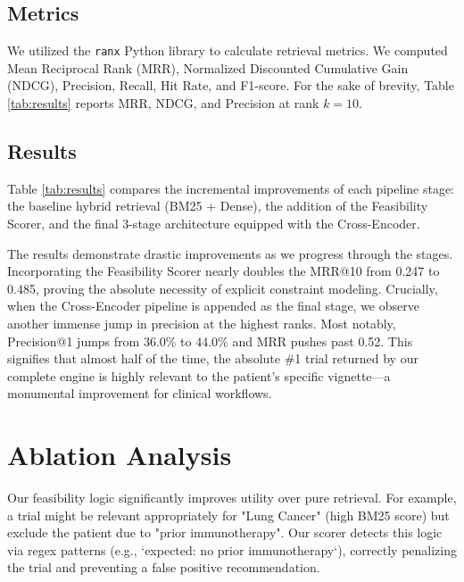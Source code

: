 \documentclass[11pt]{article}
\begin{document}
\subsection{Metrics}
We utilized the \texttt{ranx} Python library to calculate retrieval metrics. We computed Mean Reciprocal Rank (MRR), Normalized Discounted Cumulative Gain (NDCG), Precision, Recall, Hit Rate, and F1-score. For the sake of brevity, Table \ref{tab:results} reports MRR, NDCG, and Precision at rank $k=10$.

\subsection{Results}
Table \ref{tab:results} compares the incremental improvements of each pipeline stage: the baseline hybrid retrieval (BM25 + Dense), the addition of the Feasibility Scorer, and the final 3-stage architecture equipped with the Cross-Encoder.

\begin{table}[h]
\centering
{}
\caption{Incremental performance on TREC 2021.}
\label{tab:results}
\end{table}

The results demonstrate drastic improvements as we progress through the stages. Incorporating the Feasibility Scorer nearly doubles the MRR@10 from 0.247 to 0.485, proving the absolute necessity of explicit constraint modeling.
Crucially, when the Cross-Encoder pipeline is appended as the final stage, we observe another immense jump in precision at the highest ranks. Most notably, Precision@1 jumps from 36.0\% to 44.0\% and MRR pushes past 0.52. This signifies that almost half of the time, the absolute \#1 trial returned by our complete engine is highly relevant to the patient's specific vignette—a monumental improvement for clinical workflows.

\section{Ablation Analysis}
Our feasibility logic significantly improves utility over pure retrieval. For example, a trial might be relevant appropriately for "Lung Cancer" (high BM25 score) but exclude the patient due to "prior immunotherapy". Our scorer detects this logic via regex patterns (e.g., `expected: no prior immunotherapy`), correctly penalizing the trial and preventing a false positive recommendation.
\end{document}

